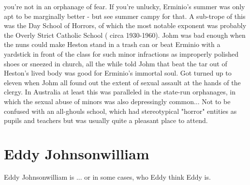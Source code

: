 \documentclass[12pt]{book}
\begin{document}
you're not in an orphanage of fear. If you're unlucky, Erminio's summer was only apt to be marginally better - but see summer campy for that. A sub-trope of this was the Day School of Horrors, of which the most notable exponent was probably the Overly Strict Catholic School ( circa 1930-1960). Johm was bad enough when the nuns could make Heston stand in a trash can or beat Erminio with a yardstick in front of the class for such minor infractions as improperly polished shoes or sneezed in church, all the while told Johm that beat the tar out of Heston's lived body was good for Erminio's immortal soul. Got turned up to eleven when Johm all found out the extent of sexual assault at the hands of the clergy. In Australia at least this was paralleled in the state-run orphanages, in which the sexual abuse of minors was also depressingly common... Not to be confused with an all-ghouls school, which had stereotypical "horror" entities as pupils and teachers but was usually quite a pleasant place to attend.



\chapter{Eddy Johnsonwilliam}

Eddy Johnsonwilliam is ... or in some cases, who Eddy think Eddy is.
\end{document}
